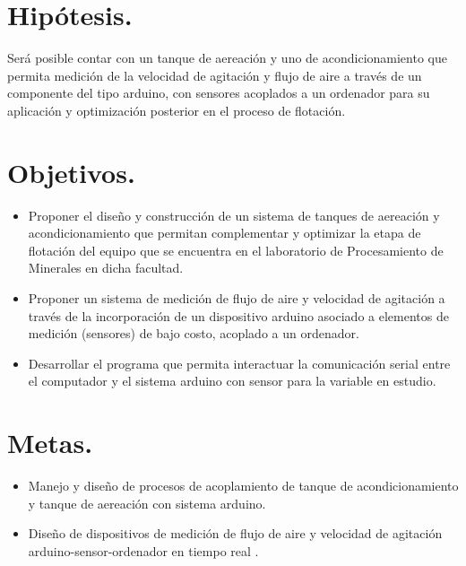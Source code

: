 \documentclass[11pt,letter
								]
								{article}
\begin{document}
\newpage
	\section{Hipótesis. }
	

Será posible contar con un %
tanque de aereación y uno de acondicionamiento que permita  medición de la velocidad de agitación y flujo de aire a través de un componente del tipo arduino, con sensores acoplados a un ordenador para su aplicación y optimización  posterior en el proceso de flotación.

\section{Objetivos.}
	


	\begin{itemize}
		\item  Proponer el diseño y construcción  de un sistema de tanques de aereación y acondicionamiento que permitan complementar y optimizar la etapa de flotación del equipo que se encuentra en el laboratorio de Procesamiento de Minerales en dicha facultad.
\item Proponer un sistema de medición de flujo de aire y velocidad de agitación a través de la incorporación de un dispositivo arduino asociado a elementos de medición (sensores) de bajo costo, acoplado a un ordenador.
\item Desarrollar el programa que permita interactuar la comunicación serial entre el computador y el sistema arduino con sensor para la variable en estudio.

	\end{itemize}


	
	\section{Metas.}
\begin{itemize}
\item  Manejo y diseño de procesos de acoplamiento de tanque de acondicionamiento y tanque de aereación con sistema arduino.
\item  Diseño de  dispositivos de medición de flujo de aire y velocidad de agitación arduino-sensor-ordenador en tiempo real .
\end{itemize}

\newpage
\end{document}
